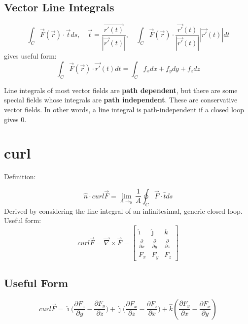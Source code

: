 \subsection{Vector Line Integrals}

\begin{equation}
	\label{}
	\int_{C}\vec{F}(\vec{r})\cdot\vec{t}ds,\quad\vec{t}=\frac{\vec{r'(t)}}{|\vec{r'}(t)|},\quad\int_{C}\vec{F}(\vec{r})\cdot \frac{\vec{r'}(t)}{|\vec{r'}(t)|}|\vec{r'}(t)|dt
\end{equation}
gives useful form:
\begin{equation}
	\label{}
	\int_{C}\vec{F}(\vec{r})\cdot\vec{r'}(t)dt=\int_C f_x dx+f_y dy+f_z dz
\end{equation}

Line integrals of most vector fields are \textbf{path dependent}, but there are some special fields whose integrals are \textbf{path independent}. These are conservative vector fields. In other words, a line integral is path-independent if a closed loop gives 0. 




\section{curl}
Definition:


\begin{equation}
	\hat{n}\cdot curl\vec{F}=\lim_{A\to_0}\frac{1}{A}\oint_{C}\vec{F}\cdot \hat{t}ds
\end{equation}
Derived by considering the line integral of an infinitesimal, generic closed loop.
Useful form:
\begin{equation}
	curl\vec{F}=\vec{\nabla}\times \vec{F}=
	\begin{bmatrix}
		\hat{\imath} &\hat{\jmath}&\hat{k}\\\frac{\partial}{\partial x} & \frac{\partial}{\partial y}&\frac{\partial}{\partial z} \\ F_{x}&F_{y}&F_{z}
	\end{bmatrix}
\end{equation}

\subsection{Useful Form}
\begin{equation}
	curl\vec{F}=\hat{\imath}\big(\frac{\partial F_{z}}{\partial y}-\frac{\partial F_{y}}{\partial z}\big)+\hat{\jmath}\big(\frac{\partial F_{x}}{\partial z}-\frac{\partial F_{z}}{\partial x}\big)+\hat{k}(\frac{\partial F_{y}}{\partial x}-\frac{\partial F_{x}}{\partial y})
\end{equation}

